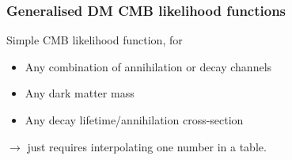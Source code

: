 \documentclass[xcolor=dvipsnames]{beamer}
\begin{document}
\begin{frame}
\frametitle{Generalised DM CMB likelihood functions}

Simple CMB likelihood function, for
\begin{itemize}
\item Any combination of annihilation or decay channels
\item Any dark matter mass 
\item Any decay lifetime/annihilation cross-section
\end{itemize}
$\rightarrow$ just requires interpolating one number in a table.\vspace{5mm}





\end{frame}
\end{document}
